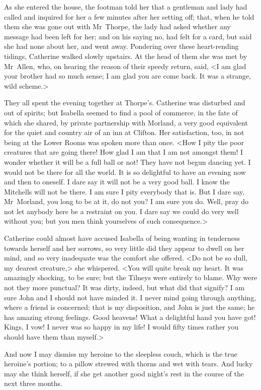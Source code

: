  As she entered the house, the footman told her that a gentleman and lady had called and inquired for her a few minutes after her setting off; that, when he told them she was gone out with Mr~Thorpe, the lady had asked whether any message had been left for her; and on his saying no, had felt for a card, but said she had none about her, and went away. Pondering over these heart-rending tidings, Catherine walked slowly upstairs. At the head of them she was met by Mr~Allen, who, on hearing the reason of their speedy return, said, <I am glad your brother had so much sense; I am glad you are come back. It was a strange, wild scheme.> 

 They all spent the evening together at Thorpe's. Catherine was disturbed and out of spirits; but Isabella seemed to find a pool of commerce, in the fate of which she shared, by private partnership with Morland, a very good equivalent for the quiet and country air of an inn at Clifton. Her satisfaction, too, in not being at the Lower Rooms was spoken more than once. <How I pity the poor creatures that are going there! How glad I am that I am not amongst them! I wonder whether it will be a full ball or not! They have not begun dancing yet. I would not be there for all the world. It is so delightful to have an evening now and then to oneself. I dare say it will not be a very good ball. I know the Mitchells will not be there. I am sure I pity everybody that is. But I dare say, Mr~Morland, you long to be at it, do not you? I am sure you do. Well, pray do not let anybody here be a restraint on you. I dare say we could do very well without you; but you men think yourselves of such consequence.> 

 Catherine could almost have accused Isabella of being wanting in tenderness towards herself and her sorrows, so very little did they appear to dwell on her mind, and so very inadequate was the comfort she offered. <Do not be so dull, my dearest creature,> she whispered. <You will quite break my heart. It was amazingly shocking, to be sure; but the Tilneys were entirely to blame. Why were not they more punctual? It was dirty, indeed, but what did that signify? I am sure John and I should not have minded it. I never mind going through anything, where a friend is concerned; that is my disposition, and John is just the same; he has amazing strong feelings. Good heavens! What a delightful hand you have got! Kings, I vow! I never was so happy in my life! I would fifty times rather you should have them than myself.> 

 And now I may dismiss my heroine to the sleepless couch, which is the true heroine's portion; to a pillow strewed with thorns and wet with tears. And lucky may she think herself, if she get another good night's rest in the course of the next three months. 